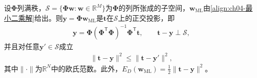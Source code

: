 \documentclass[../../main.tex]{subfiles}
\begin{document}
\begin{proposition}[最小二乘解的正交投影解释]\label{proposition:ch04-正交投影}
设$\boldsymbol{\Phi}$列满秩，$\mathcal{S}=\{\boldsymbol{\Phi}\boldsymbol{w}:\boldsymbol{w}\in\mathbb{R}^{M}\}$为$\boldsymbol{\Phi}$的列所张成的子空间，$\boldsymbol{w}_{\mathrm{ML}}$由\eqref{align:ch04-最小二乘解}给出。则$\boldsymbol{y}=\boldsymbol{\Phi}\boldsymbol{w}_{\mathrm{ML}}$是$\boldsymbol{t}$在$\mathcal{S}$上的正交投影，即
\begin{align}
  \boldsymbol{y}=\boldsymbol{\Phi}(\boldsymbol{\Phi}^{\mathsf{T}}\boldsymbol{\Phi})^{-1}\boldsymbol{\Phi}^{\mathsf{T}}\boldsymbol{t},
  \qquad
  \boldsymbol{t}-\boldsymbol{y}\perp\mathcal{S},
  \label{align:ch04-正交投影}
\end{align}
并且对任意$\boldsymbol{y}'\in\mathcal{S}$成立
\begin{align}
  \|\boldsymbol{t}-\boldsymbol{y}\|^2\leqslant\|\boldsymbol{t}-\boldsymbol{y}'\|^2,
  \label{align:ch04-投影最优}
\end{align}
其中$\|\cdot\|$为$\mathbb{R}^N$中的欧氏范数。此外，$E_D(\boldsymbol{w}_{\mathrm{ML}})=\frac{1}{2}\|\boldsymbol{t}-\boldsymbol{y}\|^2$。
\end{proposition}
\end{document}
